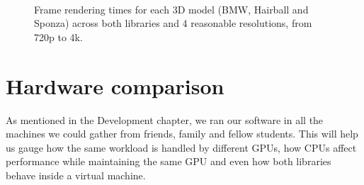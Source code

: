 \begin{figure}
    \\
    \centering
    \caption{Frame rendering times for each 3D model (BMW, Hairball and Sponza) across both libraries and 4 reasonable resolutions, from 720p to 4k.}
    \label{frametimes-overview-graph}
\end{figure}


\clearpage
\section{Hardware comparison}
As mentioned in the Development chapter, we ran our software in all the machines we could gather from friends, family and fellow students. This will help us gauge how the same workload is handled by different GPUs, how CPUs affect performance while maintaining the same GPU and even how both libraries behave inside a virtual machine.

